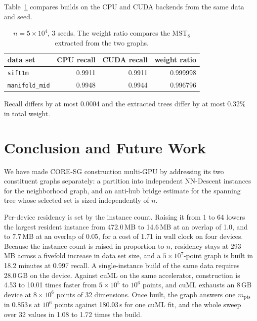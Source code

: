 \documentclass{ieeeaccess}
\newcommand{\mpts}{m_{\mathrm{pts}}}
\begin{document}
Table~\ref{tab:parity} compares builds on the CPU and CUDA backends from the
same data and seed.

\begin{table}[!t]
\caption{$n = 5\times10^4$, 3 seeds. The weight ratio compares the
$\mathrm{MST}_{8}$ extracted from the two graphs.}
\label{tab:parity}
\centering
\footnotesize
\begin{tabular}{@{}lrrr@{}}
\toprule
data set & CPU recall & CUDA recall & weight ratio \\
\midrule
\texttt{sift1m}       & 0.9911 & 0.9911 & 0.999998 \\
\texttt{manifold\_mid} & 0.9948 & 0.9944 & 0.996796 \\
\bottomrule
\end{tabular}
\end{table}

Recall differs by at most 0.0004 and the extracted trees differ by at most
0.32\% in total weight.

\section{Conclusion and Future Work}

We have made CORE-SG construction multi-GPU by addressing its two constituent
graphs separately: a partition into independent NN-Descent instances for the
neighborhood graph, and an anti-hub bridge estimate for the spanning tree whose
selected set is sized independently of $n$.

Per-device residency is set by the instance count. Raising it from 1 to 64
lowers the largest resident instance from 472.0\,MB to 14.6\,MB at an overlap of
1.0, and to 7.7\,MB at an overlap of 0.05, for a cost of 1.71 in wall clock on
four devices. Because the instance count is raised in proportion to $n$,
residency stays at 293\,MB across a fivefold increase in data set size, and a
$5\times10^7$-point graph is built in 18.2 minutes at 0.997 recall. A
single-instance build of the same data requires 28.0\,GB on the device. Against
cuML on the same accelerator, construction is 4.53 to 10.01 times faster from
$5\times10^5$ to $10^6$ points, and cuML exhausts an 8\,GB device at
$8\times10^6$ points of 32 dimensions. Once built, the graph answers one
$\mpts$ in 0.853\,s at $10^6$ points against 180.03\,s for one cuML fit, and the
whole sweep over 32 values in 1.08 to 1.72 times the build.
\end{document}

